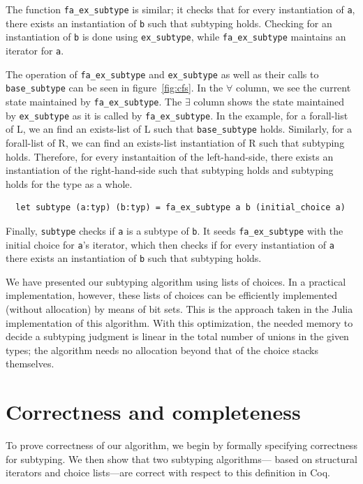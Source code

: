 \documentclass[a4paper,english]{lipics-v2019}
\begin{document}
The function \verb|fa_ex_subtype| is similar; it checks that for every
instantiation of \verb|a|, there exists an instantiation of 
\verb|b| such that subtyping holds. Checking for an instantiation
of \verb|b| is done using \verb|ex_subtype|, while \verb|fa_ex_subtype|
maintains an iterator for \verb|a|.

The operation of \verb|fa_ex_subtype| and \verb|ex_subtype| as well as their
calls to \verb|base_subtype| can be seen in figure~\ref{fig:cfs}. In the
$\forall$ column, we see the current state maintained by \verb|fa_ex_subtype|.
The $\exists$ column shows the state maintained by \verb|ex_subtype| as it is
called by \verb|fa_ex_subtype|. In the example, for a forall-list of L, we an
find an exists-list of L such that \verb|base_subtype| holds. Similarly,
for a forall-list of R, we can find an exists-list instantiation of R such
that subtyping holds. Therefore, for every instantaition of the left-hand-side,
there exists an instantiation of the right-hand-side such that subtyping holds
and subtyping holds for the type as a whole.


\begin{small}
\begin{verbatim}
  let subtype (a:typ) (b:typ) = fa_ex_subtype a b (initial_choice a)
\end{verbatim}
\end{small}

Finally, \verb|subtype| checks if \verb|a| is a subtype of \verb|b|.
It seeds \verb|fa_ex_subtype| with the initial choice for \verb|a|'s
iterator, which then checks if for every instantiation of \verb|a|
there exists an instantiation of \verb|b| such that subtyping holds.

We have presented our subtyping algorithm using lists of choices. In a
practical implementation, however, these lists of choices can be efficiently
implemented (without allocation) by means of bit sets. This is the approach
taken in the Julia implementation of this algorithm. With this optimization,
the needed memory to decide a subtyping judgment is linear in the total number
of unions in the given types; the algorithm needs no allocation beyond that
of the choice stacks themselves.

\section{Correctness and completeness}

To prove correctness of our algorithm, we begin by formally specifying
correctness for subtyping. We then show that two subtyping algorithms---
based on structural iterators and choice lists---are correct
with respect to this definition in Coq.
\end{document}
